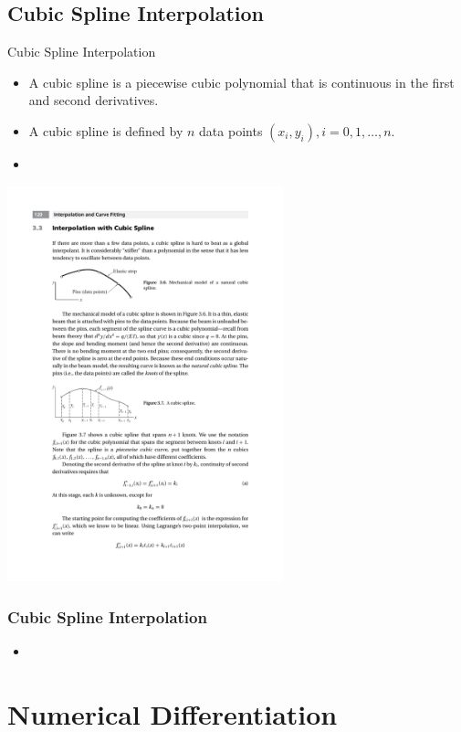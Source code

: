 \documentclass{beamer}
\begin{document}
\subsection[Cubic Spline Interpolation]{Cubic Spline Interpolation}
\begin{frame}{Cubic Spline Interpolation}
\begin{itemize}
  \item A \alert{cubic spline} is a piecewise cubic polynomial that is continuous in the first and second derivatives.
  \item A cubic spline is defined by $n$ data points $(x_i, y_i), i=0,1,\ldots,n$.
  \item 
  
\end{itemize}
\centerline{\includegraphics[width=0.6\textwidth]{Lec9_Fig6.pdf}}
\end{frame}
\begin{frame}
  \frametitle{Cubic Spline Interpolation}
  \begin{itemize}
    \item 
  \end{itemize}
\end{frame}

\section[Numerical Differentiation]{Numerical Differentiation}
\end{document}
